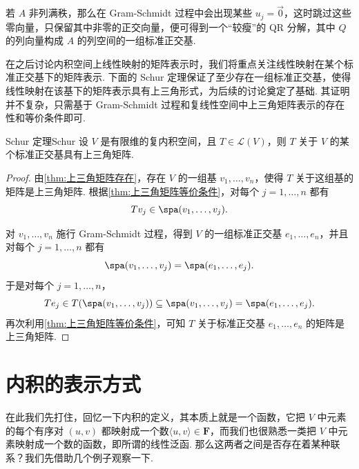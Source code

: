 若 $A$ 非列满秩，那么在 Gram-Schmidt 过程中会出现某些 $u_j = \vec{0}$，这时跳过这些零向量，只保留其中非零的正交向量，便可得到一个``较瘦''的 QR 分解，其中 $Q$ 的列向量构成 $A$ 的列空间的一组标准正交基.

在之后讨论内积空间上线性映射的矩阵表示时，我们将重点关注线性映射在某个标准正交基下的矩阵表示. 下面的 Schur 定理保证了至少存在一组标准正交基，使得线性映射在该基下的矩阵表示具有上三角形式，为后续的讨论奠定了基础. 其证明并不复杂，只需基于 Gram-Schmidt 过程和复线性空间中上三角矩阵表示的存在性和等价条件即可.

\begin{theorem}{Schur 定理}{Schur} 
    设 $ V $ 是有限维的复内积空间，且 $ T \in \mathcal{L}(V) $，则 $ T $ 关于 $ V $ 的某个标准正交基具有上三角矩阵.
\end{theorem}

\begin{proof}
    由\autoref{thm:上三角矩阵存在}，存在 $V$ 的一组基 $v_1, \ldots, v_n$，使得 $T$ 关于这组基的矩阵是上三角矩阵. 根据\autoref{thm:上三角矩阵等价条件}，对每个 $j = 1, \ldots, n$ 都有
    \[
        Tv_j \in \spa(v_1, \ldots, v_j).
    \]

    对 $v_1, \ldots, v_n$ 施行 Gram-Schmidt 过程，得到 $V$ 的一组标准正交基 $e_1, \ldots, e_n$，并且对每个 $j = 1, \ldots, n$ 都有
    \[
        \spa(v_1, \ldots, v_j) = \spa(e_1, \ldots, e_j).
    \]
    于是对每个 $j = 1, \ldots, n$，
    \[
        Te_j \in T(\spa(v_1, \ldots, v_j)) \subseteq \spa(v_1, \ldots, v_j) = \spa(e_1, \ldots, e_j).
    \]
    再次利用\autoref{thm:上三角矩阵等价条件}，可知 $T$ 关于标准正交基 $e_1, \ldots, e_n$ 的矩阵是上三角矩阵.
\end{proof}

\section{内积的表示方式}

在此我们先打住，回忆一下内积的定义，其本质上就是一个函数，它把 $ V $ 中元素的每个有序对 $(u, v)$ 都映射成一个数$ \langle u, v \rangle \in \mathbf{F}$，而我们也很熟悉一类把 $ V $ 中元素映射成一个数的函数，即所谓的线性泛函. 那么这两者之间是否存在着某种联系？我们先借助几个例子观察一下.

